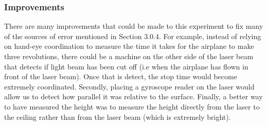\documentclass[10pt, letterpaper]{article}
\begin{document}
\subsubsection{Improvements}
There are many improvements that could be made to this experiment to fix many of the sources of error mentioned in Section 3.0.4. For example, instead of
relying on hand-eye coordination to measure the time it takes for the airplane to make three revolutions, there could be a machine on the other side of the
laser beam that detects if light beam has been cut off (i.e when the airplane has flown in front of the laser beam). Once that is detect, the stop time
would become extremely coordinated. Secondly, placing a gyroscope reader on the laser would allow us to detect how parallel it was relative to the surface.
Finally, a better way to have measured the height was to measure the height directly from the laser to the ceiling rather than from the laser beam (which is
extremely bright).
\end{document}
